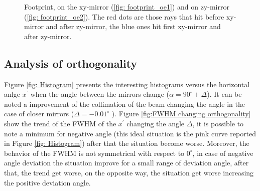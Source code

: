 \begin{figure}[H]
%
\centering
%
%
\quad
%
\caption{Footprint, on the xy-mirror (\ref{fig: footprint_oe1}) and on zy-mirror (\ref{fig: footprint_oe2}). The red dots are those rays that hit before xy-mirror and after zy-mirror, the blue ones hit first xy-mirror and after zy-mirror.}
%
\label{fig: footprint}
%
\end{figure}
\subsection{Analysis of orthogonality}
Figure \ref{fig: Histogram} presents the interesting histograms versus the horizontal anlge $x^{’} $ when the angle between the mirrors change ($\alpha = 90^{\circ} + \Delta $). It can be noted a improvement of the collimation of the beam changing the angle in the case of closer mirrors ($\Delta=-0.01^{\circ} $
). Figure \ref{fig:FWHM changing orthogonality} show the trend of the FWHM of the $x^{'} $ changing the angle $\Delta $, it is possible to note a minimum for negative angle (this ideal situation is the pink curve reported in Figure \ref{fig: Histogram}) after that the situation become worse. Moreover, the behavior of the FWHM is not symmetrical with respect to $0^{\circ} $, in case of negative angle deviation the situation improve for a small range of deviation angle, after that, the trend get worse, on the opposite way, the situation get worse increasing the positive
deviation angle.


